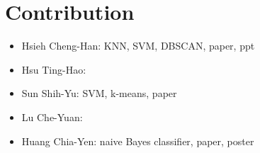 \documentclass[twocolumn,10pt]{article}
\begin{document}
\section{Contribution}
\begin{itemize}
  \item Hsieh Cheng-Han: KNN, SVM, DBSCAN, paper, ppt
  \item Hsu Ting-Hao: 
  \item Sun Shih-Yu: SVM, k-means, paper
  \item Lu Che-Yuan: 
  \item Huang Chia-Yen: naive Bayes classifier, paper, poster
\end{itemize}



\end{document}
